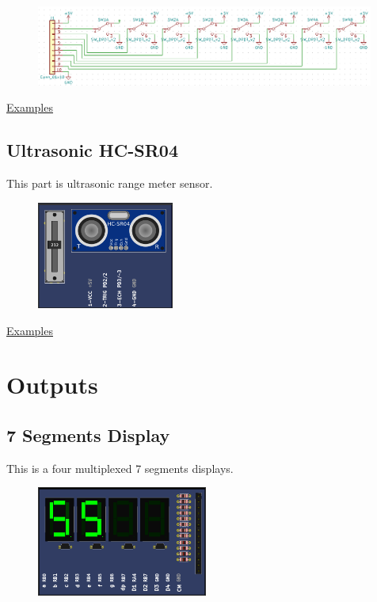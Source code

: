 \begin{figure}[H]
\center
\includegraphics[width=0.99\textwidth]{img/part_switchs_.png} 
\end{figure} 

\href{https://lcgamboa.github.io/picsimlab_examples/examples/examples_index.html\#Switchs}{Examples}



\subsection{Ultrasonic HC-SR04}
This part is ultrasonic range meter sensor.

\begin{figure}[H]
\center
\includegraphics[width=0.4\textwidth]{img/part_hcsr04.png} 
\end{figure} 


\href{https://lcgamboa.github.io/picsimlab_examples/examples/examples_index.html\#Ultrasonic_HC-SR04}{Examples}



\section{Outputs}

\subsection{7 Segments Display}

This is a four multiplexed 7 segments displays.

\begin{figure}[H]
\center
\includegraphics[width=0.5\textwidth]{img/part_7seg.png} 
\end{figure} 

